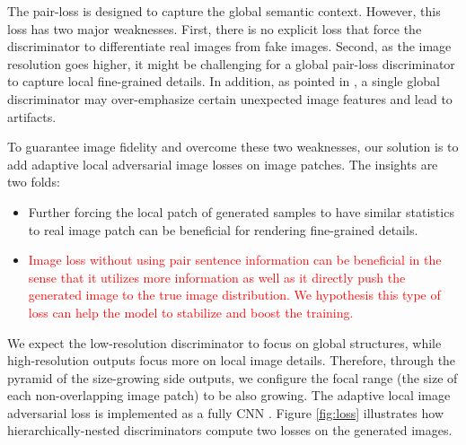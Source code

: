 \documentclass[10pt,twocolumn,letterpaper]{article}
\begin{document}
The pair-loss is designed to capture the global semantic context. However, this loss has two major weaknesses. First, there is no explicit loss that force the discriminator to differentiate real images from fake images. %
Second, as the image resolution goes higher, it might be challenging for a global pair-loss discriminator to capture local fine-grained details.  In addition, as pointed in \cite{shrivastava2016learning}, a single global discriminator may over-emphasize certain unexpected image features and lead to artifacts. 

To guarantee image fidelity and overcome these two weaknesses, our solution is to add adaptive local adversarial image losses on image patches. The insights are two folds:
\begin{itemize}\vspace{-.2cm}
\setlength\itemsep{-0.3em}
\item Further forcing the local patch of generated samples to have similar statistics to real image patch can be beneficial for rendering fine-grained details. %

\item \textcolor{red}{Image loss without using pair sentence information can be beneficial in the sense that it utilizes more information as well as it directly push the generated image to the true image distribution. We hypothesis this type of loss can help the model to stabilize and boost the training. } 
\vspace{-.2cm}
\end{itemize}
We expect the low-resolution discriminator to focus on global structures, while high-resolution outputs focus more on local image details. Therefore, through the pyramid of the size-growing side outputs, we configure the focal range (the size of each non-overlapping image patch) to be also growing.
The adaptive local image adversarial loss is implemented as a fully CNN \cite{shrivastava2016learning,zhu2017unpaired}.  
 Figure \ref{fig:loss} illustrates how hierarchically-nested discriminators compute two losses on the generated images. 
\end{document}
